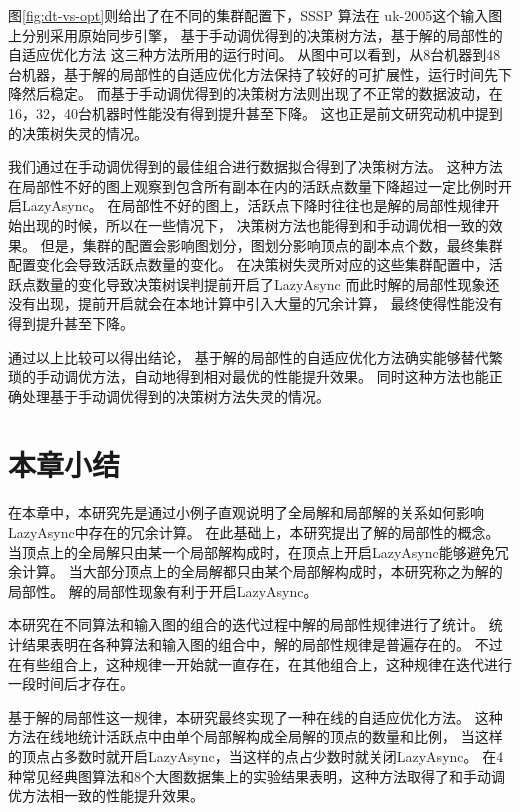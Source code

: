 图\ref{fig:dt-vs-opt}则给出了在不同的集群配置下，SSSP 算法在 uk-2005这个输入图上分别采用原始同步引擎，
基于手动调优得到的决策树方法，基于解的局部性的自适应优化方法 这三种方法所用的运行时间。
从图中可以看到，从8台机器到48台机器，基于解的局部性的自适应优化方法保持了较好的可扩展性，运行时间先下降然后稳定。
而基于手动调优得到的决策树方法则出现了不正常的数据波动，在16，32，40台机器时性能没有得到提升甚至下降。
这也正是前文研究动机中提到的决策树失灵的情况。

我们通过在手动调优得到的最佳组合进行数据拟合得到了决策树方法。
这种方法在局部性不好的图上观察到包含所有副本在内的活跃点数量下降超过一定比例时开启LazyAsync。
在局部性不好的图上，活跃点下降时往往也是解的局部性规律开始出现的时候，所以在一些情况下，
决策树方法也能得到和手动调优相一致的效果。
但是，集群的配置会影响图划分，图划分影响顶点的副本点个数，最终集群配置变化会导致活跃点数量的变化。
在决策树失灵所对应的这些集群配置中，活跃点数量的变化导致决策树误判提前开启了LazyAsync
而此时解的局部性现象还没有出现，提前开启就会在本地计算中引入大量的冗余计算，
最终使得性能没有得到提升甚至下降。

  
通过以上比较可以得出结论，
基于解的局部性的自适应优化方法确实能够替代繁琐的手动调优方法，自动地得到相对最优的性能提升效果。
同时这种方法也能正确处理基于手动调优得到的决策树方法失灵的情况。


\section{本章小结}
在本章中，本研究先是通过小例子直观说明了全局解和局部解的关系如何影响LazyAsync中存在的冗余计算。
在此基础上，本研究提出了解的局部性的概念。
当顶点上的全局解只由某一个局部解构成时，在顶点上开启LazyAsync能够避免冗余计算。
当大部分顶点上的全局解都只由某个局部解构成时，本研究称之为解的局部性。
解的局部性现象有利于开启LazyAsync。

本研究在不同算法和输入图的组合的迭代过程中解的局部性规律进行了统计。
统计结果表明在各种算法和输入图的组合中，解的局部性规律是普遍存在的。
不过在有些组合上，这种规律一开始就一直存在，在其他组合上，这种规律在迭代进行一段时间后才存在。

基于解的局部性这一规律，本研究最终实现了一种在线的自适应优化方法。
这种方法在线地统计活跃点中由单个局部解构成全局解的顶点的数量和比例，
当这样的顶点占多数时就开启LazyAsync，当这样的点占少数时就关闭LazyAsync。
在4种常见经典图算法和8个大图数据集上的实验结果表明，这种方法取得了和手动调优方法相一致的性能提升效果。
